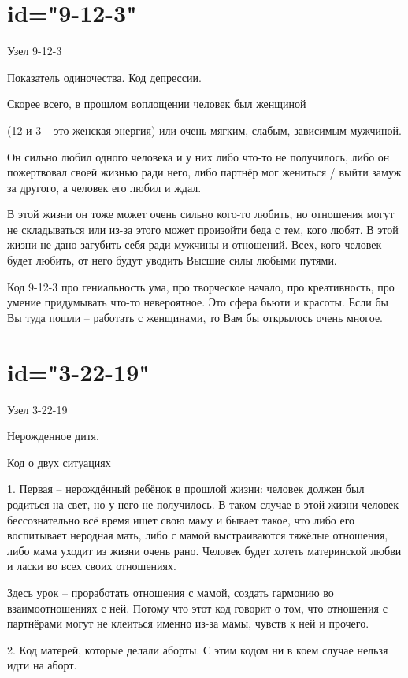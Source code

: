 \section{id="9-12-3"}{Узел 9-12-3}
\item Показатель одиночества. Код депрессии.
\item Скорее всего, в прошлом воплощении человек был женщиной
\item (12 и 3 – это женская энергия) или очень мягким, слабым, 
зависимым мужчиной.
\item Он сильно любил одного человека и у них либо что-то не 
получилось, либо он пожертвовал своей жизнью ради него, либо 
партнёр мог жениться / выйти замуж за другого, а человек его 
любил и ждал.
\item В этой жизни он тоже может очень сильно кого-то любить, 
но отношения могут не складываться или из-за этого может 
произойти беда с тем, кого любят. В этой жизни не дано загубить 
себя ради мужчины и отношений. Всех, кого человек будет любить, 
от него будут уводить Высшие силы любыми путями.
\item Код 9-12-3 про гениальность ума, про творческое начало, 
про креативность, про умение придумывать что-то невероятное. 
Это сфера бьюти и красоты. Если бы Вы туда пошли – работать 
с женщинами, то Вам бы открылось очень многое.
\endsection

\section{id="3-22-19"}{Узел 3-22-19}
\item Нерожденное дитя.
\item Код о двух ситуациях
\item 1. Первая – нерождённый ребёнок в прошлой жизни: человек 
должен был родиться на свет, но у него не получилось. В таком 
случае в этой жизни человек бессознательно всё время ищет свою 
маму и бывает такое, что либо его воспитывает неродная мать, 
либо с мамой выстраиваются тяжёлые отношения, либо мама уходит 
из жизни очень рано. Человек будет хотеть материнской любви и 
ласки во всех своих отношениях.
\item Здесь урок – проработать отношения с мамой, создать 
гармонию во взаимоотношениях с ней. Потому что этот код говорит 
о том, что отношения с партнёрами могут не клеиться именно 
из-за мамы, чувств к ней и прочего.
\item 2. Код матерей, которые делали аборты. С этим кодом ни 
в коем случае нельзя идти на аборт.
\endsection

